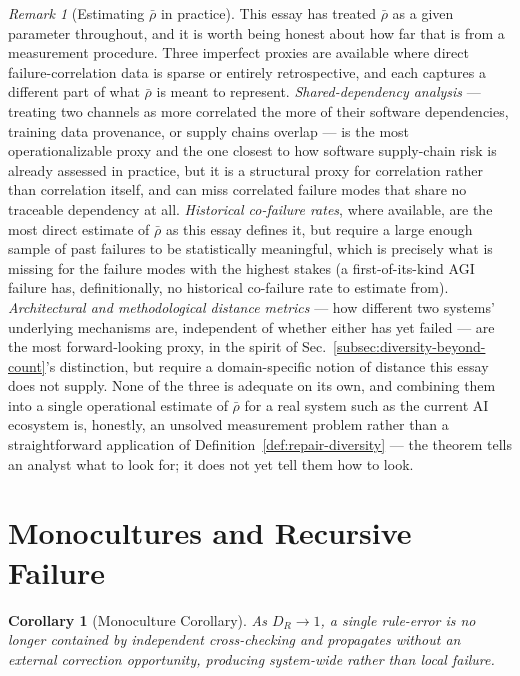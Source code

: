 \documentclass[11pt,a4paper]{article}
\theoremstyle{plain}
\newtheorem{corollary}[theorem]{Corollary}
\theoremstyle{definition}
\theoremstyle{remark}
\newtheorem{remark}[theorem]{Remark}
\newcommand{\DR}{D_R}
\begin{document}
\begin{remark}[Estimating $\bar\rho$ in practice]
\label{rem:estimating-rho}
This essay has treated $\bar\rho$ as a given parameter throughout, and it is worth being honest about how far that is from a measurement procedure. Three imperfect proxies are available where direct failure-correlation data is sparse or entirely retrospective, and each captures a different part of what $\bar\rho$ is meant to represent. \emph{Shared-dependency analysis} — treating two channels as more correlated the more of their software dependencies, training data provenance, or supply chains overlap — is the most operationalizable proxy and the one closest to how software supply-chain risk is already assessed in practice, but it is a structural proxy for correlation rather than correlation itself, and can miss correlated failure modes that share no traceable dependency at all. \emph{Historical co-failure rates}, where available, are the most direct estimate of $\bar\rho$ as this essay defines it, but require a large enough sample of past failures to be statistically meaningful, which is precisely what is missing for the failure modes with the highest stakes (a first-of-its-kind AGI failure has, definitionally, no historical co-failure rate to estimate from). \emph{Architectural and methodological distance metrics} — how different two systems' underlying mechanisms are, independent of whether either has yet failed — are the most forward-looking proxy, in the spirit of Sec.~\ref{subsec:diversity-beyond-count}'s distinction, but require a domain-specific notion of distance this essay does not supply. None of the three is adequate on its own, and combining them into a single operational estimate of $\bar\rho$ for a real system such as the current AI ecosystem is, honestly, an unsolved measurement problem rather than a straightforward application of Definition~\ref{def:repair-diversity} — the theorem tells an analyst what to look for; it does not yet tell them how to look.
\end{remark}

\section{Monocultures and Recursive Failure}
\label{sec:monocultures}

\begin{corollary}[Monoculture Corollary]
\label{cor:monoculture}
As $\DR \to 1$, a single rule-error is no longer contained by independent cross-checking and propagates without an external correction opportunity, producing system-wide rather than local failure.
\end{corollary}
\end{document}
